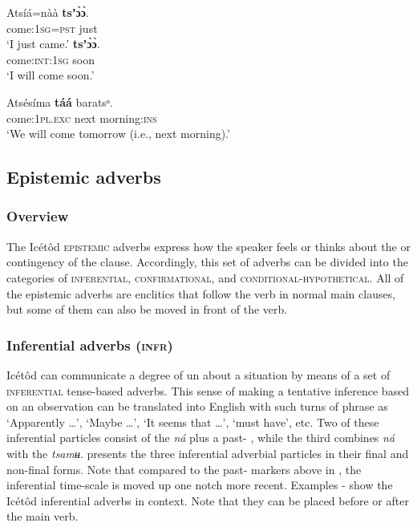 \ea\label{ex:adv:7}
  \ea
  \gll Atsíá=nàà     \textbf{tsʼ\`{ɔ}\`{ɔ}}.    \\
come:\textsc{1sg=pst}   just    \\
  \glt ‘I just came.’      
  \ex
       \textbf{tsʼ\`{ɔ}\`{ɔ}}.\\
 come:\textsc{int:1sg}   soon    \\
  \glt ‘I will come soon.’
  \z
\z




\ea\label{ex:adv:8}
\gll Atsésíma     \textbf{táá}   baratsᵒ. \\
come:\textsc{1pl.exc}   next   morning:\textsc{ins}    \\
\glt ‘We will come tomorrow (i.e., next morning).’ 
\z






\subsection{Epistemic adverbs}\label{sec:9.4}
\subsubsection{Overview}\label{sec:9.4.1}

The Icétôd \textsc{epistemic} adverbs express how the speaker feels or thinks about the  or contingency of the clause. Accordingly, this set of adverbs can be divided into the categories of \textsc{inferential}, \textsc{confirmational}, and \textsc{conditional-hypothetical}. All of the epistemic adverbs are enclitics that follow the verb in normal main clauses, but some of them can also be moved in front of the verb.


\subsubsection{Inferential adverbs (\textsc{infr})}\label{sec:9.4.2}

Icétôd can communicate a degree of un about a situation by means of a set of \textsc{inferential} tense-based adverbs. This sense of making a tentative inference based on an observation can be translated into English with such turns of phrase as ‘Apparently {\dots}’, ‘Maybe {\dots}’, ‘It seems that {\dots}’, ‘must have’, etc. Two of these inferential particles consist of the  \textit{ná} plus a past- , while the third combines \textit{ná} with the  \textit{tsamʉ}.  presents the three inferential adverbial particles in their final and non-final forms. Note that compared to the past- markers above in , the inferential time-scale is moved up one notch more recent. Examples - show the Icétôd inferential adverbs in context. Note that they can be placed before or after the main verb.


